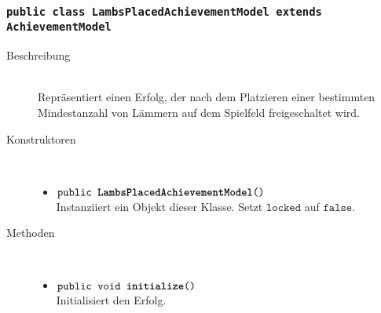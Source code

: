 		\subsubsection{\normalfont \texttt{public class \textbf{LambsPlacedAchievementModel} extends AchievementModel}}
		
		\begin{description}
		\item[Beschreibung] \hfill \\ Repräsentiert einen Erfolg, der nach dem Platzieren einer bestimmten Mindestanzahl von Lämmern auf dem Spielfeld freigeschaltet wird.
			
		\item[Konstruktoren] \hfill \\
			\vspace{-.8cm}
			\begin{itemize}
				\item $\texttt{public \textbf{LambsPlacedAchievementModel}()}$ \\ Instanziiert ein Objekt dieser Klasse. Setzt $\texttt{locked}$ auf $\texttt{false}$.
			\end{itemize}
			
		\item[Methoden] \hfill \\
			\vspace{-.8cm}
			\begin{itemize}
				\item $\texttt{public void \textbf{initialize}()}$ \\ Initialisiert den Erfolg.
				

\end{itemize}
\end{description}
